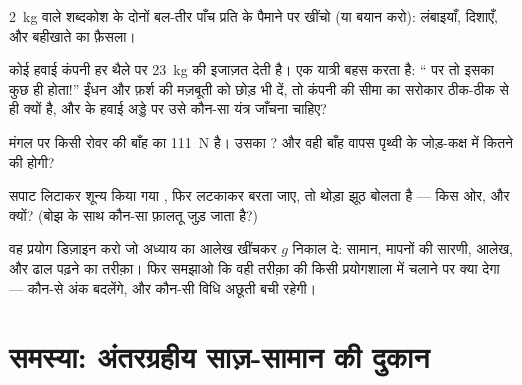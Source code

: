 \begin{exercise}[$\star$]\label{exo:g9:weight-vs-mass:8}
\qty{2}{kg} वाले शब्दकोश के दोनों बल-तीर पाँच  प्रति 
के पैमाने पर खींचो (या बयान करो): लंबाइयाँ, दिशाएँ, और बहीखाते का
फ़ैसला।
\end{exercise}

\begin{exercise}[$\star\star$]\label{exo:g9:weight-vs-mass:9}
कोई हवाई कंपनी हर थैले पर \qty{23}{kg} की इजाज़त देती है। एक यात्री
बहस करता है: `` पर तो इसका  कुछ ही  होता!'' ईंधन और
फ़र्श की मज़बूती को छोड़ भी दें, तो कंपनी की सीमा का सरोकार ठीक-ठीक
 से ही क्यों है, और  के हवाई अड्डे पर उसे कौन-सा यंत्र
जाँचना चाहिए?
\end{exercise}

\begin{exercise}[$\star\star$]\label{exo:g9:weight-vs-mass:10}
मंगल पर किसी रोवर की बाँह का  \qty{111}{N} है। उसका ? और
वही बाँह वापस पृथ्वी के जोड़-कक्ष में कितने  की होगी?
\end{exercise}

\begin{exercise}[$\star\star$]\label{exo:g9:weight-vs-mass:11}
सपाट लिटाकर शून्य किया गया , फिर लटकाकर बरता जाए, तो थोड़ा झूठ
बोलता है --- किस ओर, और क्यों? (बोझ के साथ कौन-सा फ़ालतू  जुड़
जाता है?)
\end{exercise}

\begin{exercise}[$\star\star\star$]\label{exo:g9:weight-vs-mass:12}
वह प्रयोग डिज़ाइन करो जो अध्याय का आलेख खींचकर $g$ निकाल दे: सामान,
मापनों की सारणी, आलेख, और ढाल पढ़ने का तरीक़ा। फिर समझाओ कि वही तरीक़ा
 की किसी प्रयोगशाला में चलाने पर क्या देगा --- कौन-से अंक
बदलेंगे, और कौन-सी विधि अछूती बची रहेगी।
\end{exercise}

\section{समस्या: अंतरग्रहीय साज़-सामान की दुकान}

